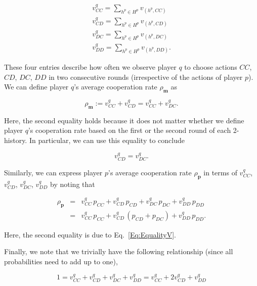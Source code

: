 \documentclass{article}
\theoremstyle{definition}
\begin{document}
\begin{equation}
\begin{array}{l}
\displaystyle v^q_{CC} = \sum_{h^p\in H^p} v_{(h^p,CC)}\\
\displaystyle v^q_{CD} = \sum_{h^p\in H^p} v_{(h^p,CD)}\\
\displaystyle v^q_{DC} = \sum_{h^p\in H^p} v_{(h^p,DC)}\\
\displaystyle v^q_{DD} = \sum_{h^p\in H^p} v_{(h^p,DD)}.
\end{array}
\end{equation}

These four entries describe how often we observe player $q$ to choose actions
$CC$, $CD$, $DC$, $DD$ in two consecutive rounds (irrespective of the actions of
player $p$). We can define player $q$'s average cooperation rate $\rho_\mathbf{m}$ as 

\begin{equation} \label{Eq:rhoq_n2}
\rho_\mathbf{m} := v^q_{CC} + v^q_{CD} = v^q_{CC} + v^q_{DC}.
\end{equation}

Here, the second equality holds because it does not matter whether we define
player $q$'s cooperation rate based on the first or the second round of each
2-history. In particular, we can use this equality to conclude

\begin{equation} \label{Eq:EqualityV}
v^q_{CD} = v^q_{DC}.
\end{equation}

Similarly, we can express player $p$'s average cooperation rate
$\rho_\mathbf{p}$ in terms of $v^q_{CC}$, $v^q_{CD}$, $v^q_{DC}$, $v^q_{DD}$ by
noting that

\begin{equation} \label{Eq:rhop_n2}
\begin{array}{lll}
\rho_\mathbf{p} &= &\displaystyle v^q_{CC}\, p_{CC} +  v^q_{CD}\,p_{CD} + v^q_{DC}\, p_{DC} + v^q_{DD}\, p_{DD}\\[0.2cm]
	& =  &v^q_{CC}\, p_{CC} +  v^q_{CD}\,(p_{CD}\!+\!p_{DC}) + v^q_{DD}\, p_{DD}.
\end{array}
\end{equation}

Here, the second equality is due to Eq.~\eqref{Eq:EqualityV}.

Finally, we note that we trivially have the following relationship (since all probabilities need to add up to one),

\begin{equation} \label{Eq:normalization}
1 = v^q_{CC} +  v^q_{CD} + v^q_{DC} + v^q_{DD} = v^q_{CC} +  2v^q_{CD} + v^q_{DD}
\end{equation}
\end{document}
